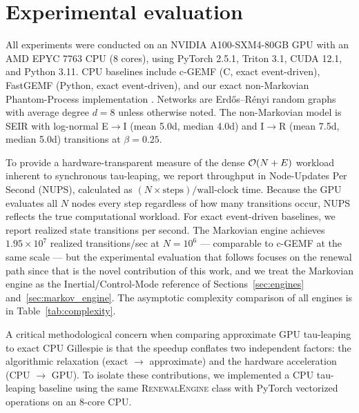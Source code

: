 \section{Experimental evaluation}\label{sec:experiments}

All experiments were conducted on an NVIDIA A100-SXM4-80GB GPU with an AMD EPYC 7763 CPU (8 cores), using PyTorch 2.5.1, Triton 3.1, CUDA 12.1, and Python 3.11. CPU baselines include c-GEMF \citep{sahneh2017gemfsim} (C, exact event-driven), FastGEMF \citep{samaei2025fastgemf} (Python, exact event-driven), and our exact non-Markovian Phantom-Process implementation \citep{vajdi2020stochastic}. Networks are Erd\H{o}s--R\'{e}nyi random graphs with average degree $d = 8$ unless otherwise noted. The non-Markovian model is SEIR with log-normal E$\to$I (mean 5.0d, median 4.0d) and I$\to$R (mean 7.5d, median 5.0d) transitions at $\beta = 0.25$.

To provide a hardware-transparent measure of the dense $\mathcal{O}(N+E)$ workload inherent to synchronous tau-leaping, we report throughput in Node-Updates Per Second (NUPS), calculated as $(N \times \text{steps}) / \text{wall-clock time}$. Because the GPU evaluates all $N$ nodes every step regardless of how many transitions occur, NUPS reflects the true computational workload. For exact event-driven baselines, we report realized state transitions per second. The Markovian engine achieves $1.95 \times 10^7$ realized transitions/sec at $N=10^6$ --- comparable to c-GEMF \citep{sahneh2017gemfsim} at the same scale --- but the experimental evaluation that follows focuses on the renewal path since that is the novel contribution of this work, and we treat the Markovian engine as the Inertial/Control-Mode reference of Sections~\ref{sec:engines} and~\ref{sec:markov_engine}. The asymptotic complexity comparison of all engines is in Table~\ref{tab:complexity}.

A critical methodological concern when comparing approximate GPU tau-leaping to exact CPU Gillespie is that the speedup conflates two independent factors: the algorithmic relaxation (exact $\to$ approximate) and the hardware acceleration (CPU $\to$ GPU). To isolate these contributions, we implemented a CPU tau-leaping baseline using the same \textsc{RenewalEngine} class with PyTorch vectorized operations on an 8-core CPU.

